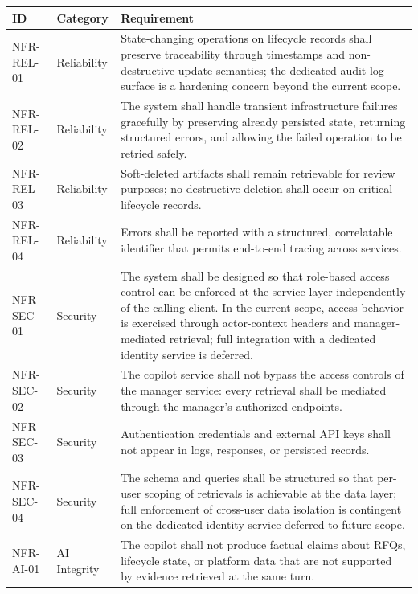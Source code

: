 \begin{table}[H]
\centering
\renewcommand{\arraystretch}{1.3}
\begin{tabular}{|p{2cm}|p{1.6cm}|p{10.4cm}|}
\hline
\rowcolor{lightgray}
\textbf{ID} & \textbf{Category} & \textbf{Requirement} \\ \hline
NFR-REL-01 & Reliability & State-changing operations on lifecycle records shall preserve traceability through timestamps and non-destructive update semantics; the dedicated audit-log surface is a hardening concern beyond the current scope. \\ \hline
NFR-REL-02 & Reliability & The system shall handle transient infrastructure failures gracefully by preserving already persisted state, returning structured errors, and allowing the failed operation to be retried safely. \\ \hline
NFR-REL-03 & Reliability & Soft-deleted artifacts shall remain retrievable for review purposes; no destructive deletion shall occur on critical lifecycle records. \\ \hline
NFR-REL-04 & Reliability & Errors shall be reported with a structured, correlatable identifier that permits end-to-end tracing across services. \\ \hline
NFR-SEC-01 & Security & The system shall be designed so that role-based access control can be enforced at the service layer independently of the calling client. In the current scope, access behavior is exercised through actor-context headers and manager-mediated retrieval; full integration with a dedicated identity service is deferred. \\ \hline
NFR-SEC-02 & Security & The copilot service shall not bypass the access controls of the manager service: every retrieval shall be mediated through the manager's authorized endpoints. \\ \hline
NFR-SEC-03 & Security & Authentication credentials and external API keys shall not appear in logs, responses, or persisted records. \\ \hline
NFR-SEC-04 & Security & The schema and queries shall be structured so that per-user scoping of retrievals is achievable at the data layer; full enforcement of cross-user data isolation is contingent on the dedicated identity service deferred to future scope. \\ \hline
NFR-AI-01 & AI Integrity & The copilot shall not produce factual claims about RFQs, lifecycle state, or platform data that are not supported by evidence retrieved at the same turn. \\ \hline

\end{tabular}
\end{table}
